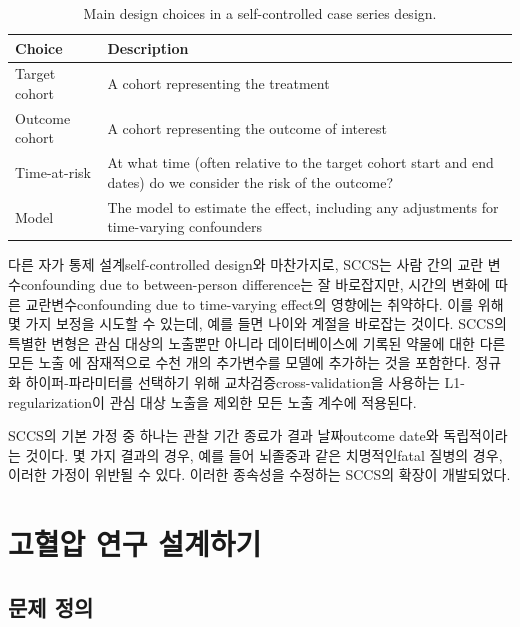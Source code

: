 \documentclass[10.5pt]{book}
\theoremstyle{definition}
\theoremstyle{definition}
\theoremstyle{definition}
\theoremstyle{remark}
\begin{document}
\begin{table}[t]

\caption{\label{tab:sccsChoices}Main design choices in a self-controlled case series design.}
\centering
\begin{tabu} to 
\toprule
Choice & Description\\
\midrule
Target cohort & A cohort representing the treatment\\
Outcome cohort & A cohort representing the outcome of interest\\
Time-at-risk & At what time (often relative to the target cohort start and end dates) do we consider the risk of the outcome?\\
Model & The model to estimate the effect, including any adjustments for time-varying confounders\\
\bottomrule
\end{tabu}
\end{table}

다른 자가 통제 설계self-controlled design와 마찬가지로, SCCS는 사람 간의
교란 변수confounding due to between-person difference는 잘 바로잡지만,
시간의 변화에 따른 교란변수confounding due to time-varying effect의
영향에는 취약하다. 이를 위해 몇 가지 보정을 시도할 수 있는데, 예를 들면
나이와 계절을 바로잡는 것이다. SCCS의 특별한 변형은 관심 대상의 노출뿐만
아니라 데이터베이스에 기록된 약물에 대한 다른 모든 노출
\citep{simpson_2013} 에 잠재적으로 수천 개의 추가변수를 모델에 추가하는
것을 포함한다. 정규화 하이퍼-파라미터를 선택하기 위해
교차검증cross-validation을 사용하는 L1-regularization이 관심 대상 노출을
제외한 모든 노출 계수에 적용된다.

SCCS의 기본 가정 중 하나는 관찰 기간 종료가 결과 날짜outcome date와
독립적이라는 것이다. 몇 가지 결과의 경우, 예를 들어 뇌졸중과 같은
치명적인fatal 질병의 경우, 이러한 가정이 위반될 수 있다. 이러한 종속성을
수정하는 SCCS의 확장이 개발되었다. \citep{farrington_2011}

\section{고혈압 연구 설계하기}\label{--}

\subsection{문제 정의}\label{--1}
\end{document}
